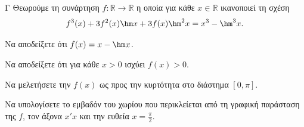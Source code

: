 \begin{thema}{Γ}
Θεωρούμε τη συνάρτηση $f: \mathbb{R} \to \mathbb{R}$ η οποία για κάθε $x \in \mathbb{R}$ ικανοποιεί τη σχέση \[f^3(x) + 3f^2(x)\hm x + 3f(x)\hm^2 x = x^3 - \hm^3 x.\]
\begin{erwthma}
  \item Να αποδείξετε ότι $f(x) = x - \hm x$.
  \item Να αποδείξετε ότι για κάθε $x > 0$ ισχύει $f(x) > 0$.
  \item Να μελετήσετε την $f(x)$ ως προς την κυρτότητα στο διάστημα $[0, \pi]$.
  \item Να υπολογίσετε το εμβαδόν του χωρίου που περικλείεται από τη γραφική παράσταση της $f$, τον άξονα $x'x$ και την ευθεία $x = \frac{\pi}{2}$.
\end{erwthma}
\end{thema}
